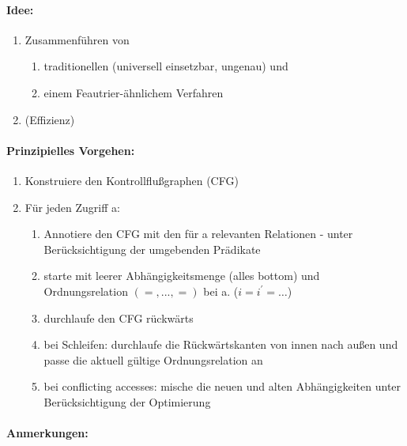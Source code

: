 \paragraph{Idee:}
\begin{enumerate}
    \item Zusammenführen von
    \begin {enumerate}
        \item traditionellen (universell einsetzbar, ungenau) und
        \item einem Feautrier-ähnlichem Verfahren
    \end{enumerate}
    \item (Effizienz)
\end{enumerate}

\paragraph{Prinzipielles Vorgehen:}
\begin{enumerate}
    \item Konstruiere den Kontrollflußgraphen (CFG)
    \item Für jeden Zugriff a:
        \begin{enumerate}
            \item Annotiere den CFG mit den für a relevanten Relationen - unter Berücksichtigung der umgebenden Prädikate
            \item starte mit leerer Abhängigkeitsmenge (alles bottom) und Ordnungsrelation $(=,...,=)$ bei a. (\( i = i^\prime = \dots \))
            \item durchlaufe den CFG rückwärts
            \item bei Schleifen: durchlaufe die Rückwärtskanten von innen nach außen und passe die aktuell gültige Ordnungsrelation an
            \item bei \glqq conflicting accesses\grqq : mische die neuen und alten Abhängigkeiten unter Berücksichtigung der Optimierung
        \end{enumerate}
\end{enumerate}


\paragraph{Anmerkungen:}


